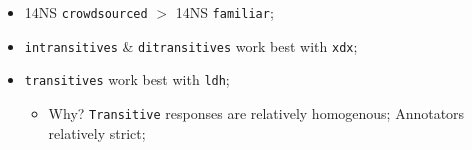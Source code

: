\documentclass[xcolor={dvipsnames}]{beamer}
\newcommand{\param}[1]{\texttt{#1}}
\begin{document}
\begin{frame}
\begin{itemize}
\pause
\item 14NS \param{crowdsourced} $>$ 14NS \param{familiar};
\pause
\item \param{intransitives} \& \param{ditransitives} work best with \param{xdx};
\pause
\item \param{transitives} work best with \param{ldh};
\begin{itemize}
\pause
\item Why? \param{Transitive} responses are relatively homogenous; Annotators relatively strict;
\end{itemize}
\end{itemize}



\end{frame}


\end{document}
